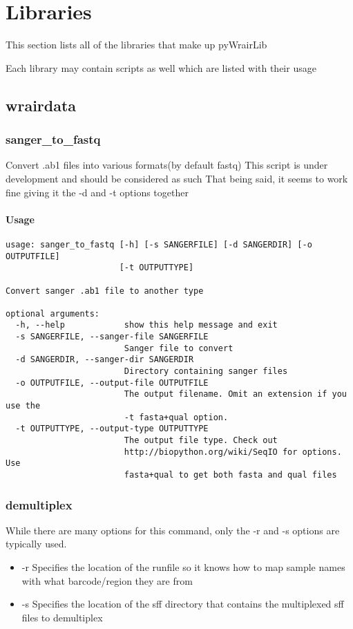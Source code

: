 \documentclass{article}
\begin{document}
\section{Libraries}
This section lists all of the libraries that make up pyWrairLib

Each library may contain scripts as well which are listed with their usage

\subsection{wrairdata}

\subsubsection{sanger\_to\_fastq}
Convert .ab1 files into various formats(by default fastq)
This script is under development and should be considered as such
That being said, it seems to work fine giving it the -d and -t options together

\paragraph{Usage}

\begin{lstlisting}
usage: sanger_to_fastq [-h] [-s SANGERFILE] [-d SANGERDIR] [-o OUTPUTFILE]
                       [-t OUTPUTTYPE]

Convert sanger .ab1 file to another type

optional arguments:
  -h, --help            show this help message and exit
  -s SANGERFILE, --sanger-file SANGERFILE
                        Sanger file to convert
  -d SANGERDIR, --sanger-dir SANGERDIR
                        Directory containing sanger files
  -o OUTPUTFILE, --output-file OUTPUTFILE
                        The output filename. Omit an extension if you use the
                        -t fasta+qual option.
  -t OUTPUTTYPE, --output-type OUTPUTTYPE
                        The output file type. Check out
                        http://biopython.org/wiki/SeqIO for options. Use
                        fasta+qual to get both fasta and qual files
\end{lstlisting}

\subsubsection{demultiplex}
While there are many options for this command, only the -r and -s options are typically used.
\begin{itemize}
 \item -r Specifies the location of the runfile so it knows how to map sample names with what barcode/region they are from
 \item -s Specifies the location of the sff directory that contains the multiplexed sff files to demultiplex
\end{itemize}
\end{document}
